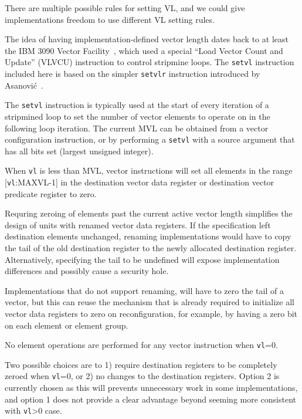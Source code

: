\begin{discussion}
  There are multiple possible rules for setting VL, and we could give
  implementations freedom to use different VL setting rules.
\end{discussion}

\begin{commentary}
  The idea of having implementation-defined vector length dates back
  to at least the IBM 3090 Vector Facility~\cite{ibm370varch}, which
  used a special ``Load Vector Count and Update'' (VLVCU) instruction
  to control stripmine loops.  The {\tt setvl} instruction included
  here is based on the simpler {\tt setvlr} instruction introduced by
  Asanovi\'{c}~\cite{krstephd}.
\end{commentary}

The {\tt setvl} instruction is typically used at the start of every
iteration of a stripmined loop to set the number of vector elements to
operate on in the following loop iteration.  The current MVL can be
obtained from a vector configuration instruction, or by performing a
{\tt setvl} with a source argument that has all bits set (largest
unsigned integer).

When {\tt vl} is less than MVL, vector instructions will set all
elements in the range [{\tt vl}:MAXVL-1] in the destination vector
data register or destination vector predicate register to zero.

\begin{commentary}
  Requring zeroing of elements past the current active vector length
  simplifies the design of units with renamed vector data registers.
  If the specification left destination elements unchanged, renaming
  implementations would have to copy the tail of the old destination
  register to the newly allocated destination register.
  Alternatively, specifying the tail to be undefined will expose
  implementation differences and possibly cause a security hole.

  Implementations that do not support renaming, will have to zero the
  tail of a vector, but this can reuse the mechanism that is already
  required to initialize all vector data registers to zero on
  reconfiguration, for example, by having a zero bit on each element
  or element group.
\end{commentary}

No element operations are performed for any vector instruction when
{\tt vl}=0.

\begin{commentary}
  Two possible choices are to 1) require destination registers to be
  completely zeroed when {\tt vl}=0, or 2) no changes to the
  destination registers.  Option 2 is currently chosen as this will
  prevents unnecessary work in some implementations, and option 1 does
  not provide a clear advantage beyond seeming more consistent with
  {\tt vl}>0 case.
\end{commentary}


